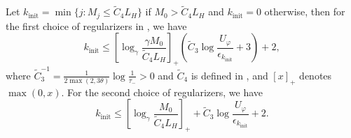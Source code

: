 \begin{proposition}
    \label{prop:proof/initial-phase-decreasing-Mk}
    Let $k_{\mathrm{init}} = \min\{ j : M_j \leq \tilde C_4 L_H \}$ if $M_0 > \tilde C_4 L_H$ and $k_{\mathrm{init}} = 0$ otherwise, then 
    for the first choice of regularizers in , we have
    \begin{equation}
        k_{\mathrm{init}}  
        \leq 
        \left[ \log_\gamma \frac{\gamma M_0}{\tilde C_4 L_H} \right]_+
        \left ( \tilde C_3 \log \frac{U_\varphi}{\epsilon_{k_{\mathrm{init}}}} + 3 \right )
        + 2
        ,
    \end{equation}
    where $\tilde C_3^{-1} = \frac{1}{2\max(2, 3\theta)} \log\frac{1}{\tau_-} > 0$ and $\tilde C_4$ is defined in ,
    and $[x]_+$ denotes $\max(0, x)$.
    For the second choice of regularizers, we have
    \begin{equation}
        k_{\mathrm{init}} 
        \leq 
        \left[ \log_\gamma \frac{M_0}{\tilde C_4 L_H} \right]_+
        + \tilde C_3 \log \frac{U_\varphi}{\epsilon_{k_{\mathrm{init}}}}
        + 2
        .
    \end{equation}
\end{proposition}
